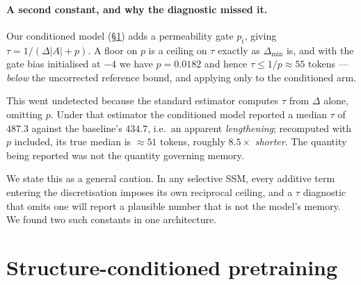 \documentclass[10pt]{article}
\begin{document}
\paragraph{A second constant, and why the diagnostic missed it.}
Our conditioned model (\S\ref{sec:method}) adds a permeability gate $p_t$, giving
$\tau = 1/(\Delta|A| + p)$. A floor on $p$ is a ceiling on $\tau$ exactly as
$\Delta_{\min}$ is, and with the gate bias initialised at $-4$ we have
$p = 0.0182$ and hence $\tau \le 1/p \approx 55$ tokens --- \emph{below} the
uncorrected reference bound, and applying only to the conditioned arm.

This went undetected because the standard estimator computes $\tau$ from
$\Delta$ alone, omitting $p$. Under that estimator the conditioned model
reported a median $\tau$ of $487.3$ against the baseline's $434.7$, i.e.\ an
apparent \emph{lengthening}; recomputed with $p$ included, its true median is
$\approx 51$ tokens, roughly $8.5\times$ \emph{shorter}. The quantity being
reported was not the quantity governing memory.

We state this as a general caution. In any selective SSM, every additive term
entering the discretisation imposes its own reciprocal ceiling, and a $\tau$
diagnostic that omits one will report a plausible number that is not the model's
memory. We found two such constants in one architecture.

\section{Structure-conditioned pretraining}
\label{sec:method}
\end{document}
